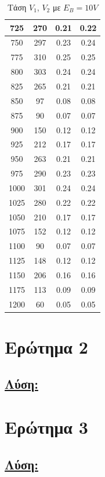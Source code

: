 \documentclass[a4paper,12pt,titlepage]{article}
\begin{document}
\begin{table}[h!]
\begin{center}
\begin{tabular}{|c|c|c|c|}
\hline
725&270&0.21&0.22\\
\hline
750&297&0.23&0.24\\
\hline
775&310&0.25&0.25\\
\hline
800&303&0.24&0.24\\
\hline
825&265&0.21&0.21\\
\hline
850&97&0.08&0.08\\
\hline
875&90&0.07&0.07\\
\hline
900&150&0.12&0.12\\
\hline
925&212&0.17&0.17\\
\hline
950&263&0.21&0.21\\
\hline
975&290&0.23&0.23\\
\hline
1000&301&0.24&0.24\\
\hline
1025&280&0.22&0.22\\
\hline
1050&210&0.17&0.17\\
\hline
1075&152&0.12&0.12\\
\hline
1100&90&0.07&0.07\\
\hline
1125&148&0.12&0.12\\
\hline
1150&206&0.16&0.16\\
\hline
1175&113&0.09&0.09\\
\hline
1200&60&0.05&0.05\\
\hline
\end{tabular}
\end{center}
\caption{Τάση $V_{1}$, $V_{2}$ με $E_{B}=10V$ }
\end{table}

\section{Ερώτημα 2}


\subsection*{\underline{Λύση:}}


\section{Ερώτημα 3}


\subsection*{\underline{Λύση:}}
\end{document}
